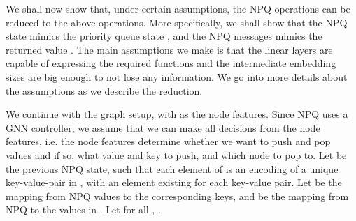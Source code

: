 \documentclass{article}
\theoremstyle{plain}
\theoremstyle{definition}
\theoremstyle{remark}
\begin{document}
We shall now show that, under certain assumptions, the NPQ operations can be reduced to the above operations. More specifically, we shall show that
the NPQ state  mimics the priority queue state , and the NPQ messages  mimics the returned value .
The main assumptions we make is that the linear layers are capable of expressing the required functions and the intermediate embedding sizes are big enough to not lose
any information. We go into more details about the assumptions as we describe the reduction.

We continue with the graph  setup, with  as the node features.
Since NPQ uses a GNN controller, we assume that we can make all decisions from the node features, i.e. the node features determine whether we want to push and
pop values and if so, what value and key to push, and which node to pop to. Let 
be the previous NPQ state, such that each element of  is an encoding of a unique key-value-pair in , with an element existing for each
key-value pair. Let  be the mapping from NPQ values to the corresponding keys, and  be the mapping from NPQ to the values in .
Let for all , .
\end{document}
